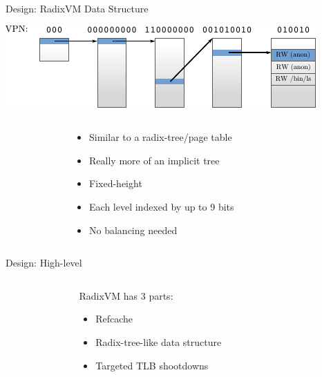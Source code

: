 \documentclass[aspectratio=169]{beamer}
\newcommand{\bi}{\begin{itemize}}
\newcommand{\ei}{\end{itemize}}
\begin{document}
\begin{frame}{Design: RadixVM Data Structure}
  \begin{center}
  \includegraphics[scale=1.5]{./figures/radix.pdf}
  \end{center}
  \begin{columns}[T]
    \begin{column}{0.2\textwidth}
    \end{column}
    \begin{column}{0.6\textwidth}
      \bi
    \item Similar to a radix-tree/page table
    \item Really more of an implicit tree
    \item Fixed-height
    \item Each level indexed by up to 9 bits
    \item No balancing needed
      \ei
    \end{column}
    \begin{column}{0.2\textwidth}
    \end{column}
  \end{columns}
\end{frame}

\begin{frame}{Design: High-level}
  \begin{columns}[T]
    \begin{column}{0.3\textwidth}
    \end{column}
    \begin{column}{0.4\textwidth}
      RadixVM has 3 parts:
      \bi
    \item Refcache
    \item Radix-tree-like data structure
    \item {Targeted TLB shootdowns}
      \ei
    \end{column}
    \begin{column}{0.3\textwidth}
    \end{column}
  \end{columns}
\end{frame}
\end{document}
